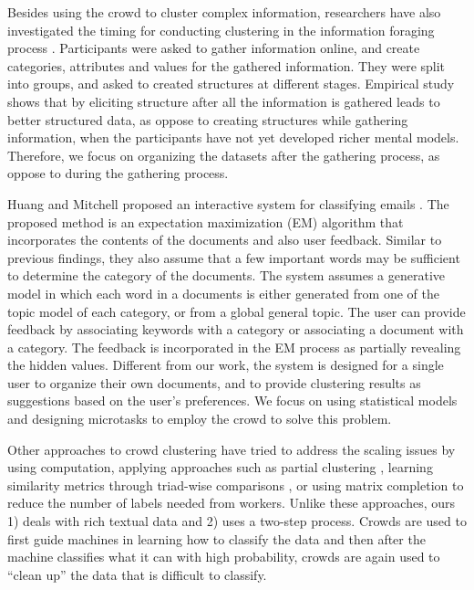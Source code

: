 Besides using the crowd to cluster complex information, researchers
have also investigated the timing for conducting clustering in the information foraging
process \cite{kittur2013costs}. Participants were asked to gather information
online, and create categories, attributes and values for the gathered
information.  They were split into groups, and asked to created structures at
different stages.  Empirical study shows that by eliciting structure after all
the information is gathered leads to better structured data, as oppose to
creating structures while gathering information, when the participants have not
yet developed richer mental models.  Therefore, we focus on organizing the
datasets after the gathering process, as oppose to during the gathering
process.

Huang and Mitchell proposed an interactive system for classifying emails
\cite{huang2006text}. The proposed method is an expectation maximization (EM)
algorithm that incorporates the contents of the documents and also user
feedback. Similar to previous findings, they also assume that a few important
words may be sufficient to determine the category of the documents. The system
assumes a generative model in which each word in a documents is either
generated from one of the topic model of each category, or from a global
general topic. The user can provide feedback by associating keywords with a
category or associating a document with a category.  The feedback is
incorporated in the EM process as partially revealing the hidden values.
Different from our work, the system is designed for a single user to organize
their own documents, and to provide clustering results as suggestions based on
the user's preferences. We focus on using statistical models and designing
microtasks to employ the crowd to solve this problem.

Other approaches to crowd clustering have tried to address the scaling issues
by using computation, applying approaches such as partial clustering
\cite{yi2012crowdclustering}, learning similarity metrics through triad-wise
comparisons \cite{tamuz2011adaptively}, or using matrix completion
\cite{yi2012semi} to reduce the number of labels needed from workers. Unlike
these approaches, ours 1) deals with rich textual data and 2) uses a two-step
process. Crowds are used to first guide machines in learning how to
classify the data and then after the machine classifies what it can with high
probability, crowds are again used to ``clean up'' the data that is difficult
to classify.

